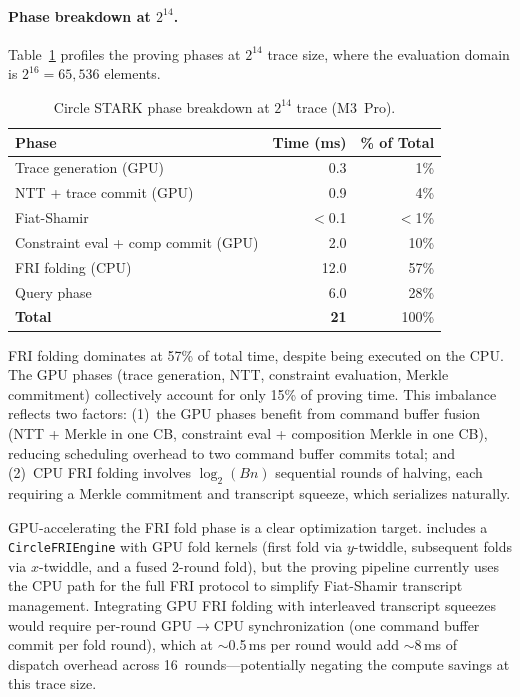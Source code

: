 \paragraph{Phase breakdown at $2^{14}$.}
Table~\ref{tab:circle-phase} profiles the proving phases at $2^{14}$ trace
size, where the evaluation domain is $2^{16} = 65{,}536$ elements.

\begin{table}[t]
\centering
\small
\caption{Circle STARK phase breakdown at $2^{14}$ trace (M3~Pro).}
\label{tab:circle-phase}
\begin{tabular}{lrr}
\toprule
Phase & Time (ms) & \% of Total \\
\midrule
Trace generation (GPU) & 0.3 & 1\% \\
NTT + trace commit (GPU) & 0.9 & 4\% \\
Fiat-Shamir & $<$0.1 & $<$1\% \\
Constraint eval + comp commit (GPU) & 2.0 & 10\% \\
FRI folding (CPU) & 12.0 & 57\% \\
Query phase & 6.0 & 28\% \\
\midrule
\textbf{Total} & \textbf{21} & 100\% \\
\bottomrule
\end{tabular}
\end{table}

FRI folding dominates at 57\% of total time, despite being executed on the
CPU.  The GPU phases (trace generation, NTT, constraint evaluation, Merkle
commitment) collectively account for only 15\% of proving time.  This
imbalance reflects two factors: (1)~the GPU phases benefit from
command buffer fusion (NTT + Merkle in one CB, constraint eval +
composition Merkle in one CB), reducing scheduling overhead to two command
buffer commits total; and (2)~CPU FRI folding involves $\log_2(Bn)$
sequential rounds of halving, each requiring a Merkle commitment and
transcript squeeze, which serializes naturally.

GPU-accelerating the FRI fold phase is a clear optimization target.  \sys
includes a \texttt{CircleFRIEngine} with GPU fold kernels (first fold via
$y$-twiddle, subsequent folds via $x$-twiddle, and a fused 2-round fold),
but the proving pipeline currently uses the CPU path for the full FRI
protocol to simplify Fiat-Shamir transcript management.  Integrating
GPU FRI folding with interleaved transcript squeezes would require
per-round GPU$\to$CPU synchronization (one command buffer commit per fold
round), which at ${\sim}$0.5\,ms per round would add ${\sim}$8\,ms of
dispatch overhead across 16~rounds---potentially negating the compute
savings at this trace size.

